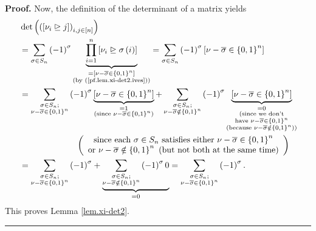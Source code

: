 \documentclass
[numbers=enddot,12pt,final,onecolumn,notitlepage,english]{scrartcl}%
\theoremstyle{definition}
\newenvironment{proof}[1][Proof]{\noindent\textbf{#1.} }{\ \rule{0.5em}{0.5em}}
\let\sumnonlimits\sum
\let\prodnonlimits\prod
\renewcommand{\sum}{\sumnonlimits\limits}
\renewcommand{\prod}{\prodnonlimits\limits}
\newenvironment{verlong}{}{}
\begin{document}
\begin{verlong}
\begin{proof}
Now, the definition of the determinant of a matrix yields%
\begin{align*}
&  \det\left(  \left(  \left[  \nu_{i}\trianglerighteq j\right]  \right)
_{i,j\in\left[  n\right]  }\right) \\
&  =\sum_{\sigma\in S_{n}}\left(  -1\right)  ^{\sigma}\underbrace{\prod
_{i=1}^{n}\left[  \nu_{i}\trianglerighteq\sigma\left(  i\right)  \right]
}_{\substack{=\left[  \nu-\overline{\sigma}\in\left\{  0,1\right\}
^{n}\right]  \\\text{(by (\ref{pf.lem.xi-det2.ives}))}}}=\sum_{\sigma\in
S_{n}}\left(  -1\right)  ^{\sigma}\left[  \nu-\overline{\sigma}\in\left\{
0,1\right\}  ^{n}\right] \\
&  =\sum_{\substack{\sigma\in S_{n};\\\nu-\overline{\sigma}\in\left\{
0,1\right\}  ^{n}}}\left(  -1\right)  ^{\sigma}\underbrace{\left[
\nu-\overline{\sigma}\in\left\{  0,1\right\}  ^{n}\right]  }%
_{\substack{=1\\\text{(since }\nu-\overline{\sigma}\in\left\{  0,1\right\}
^{n}\text{)}}}+\sum_{\substack{\sigma\in S_{n};\\\nu-\overline{\sigma}%
\notin\left\{  0,1\right\}  ^{n}}}\left(  -1\right)  ^{\sigma}%
\underbrace{\left[  \nu-\overline{\sigma}\in\left\{  0,1\right\}  ^{n}\right]
}_{\substack{=0\\\text{(since we don't}\\\text{have }\nu-\overline{\sigma}%
\in\left\{  0,1\right\}  ^{n}\\\text{(because }\nu-\overline{\sigma}%
\notin\left\{  0,1\right\}  ^{n}\text{))}}}\\
&  \ \ \ \ \ \ \ \ \ \ \ \ \ \ \ \ \ \ \ \ \left(
\begin{array}
[c]{c}%
\text{since each }\sigma\in S_{n}\text{ satisfies either }\nu-\overline
{\sigma}\in\left\{  0,1\right\}  ^{n}\\
\text{or }\nu-\overline{\sigma}\notin\left\{  0,1\right\}  ^{n}\text{ (but not
both at the same time)}%
\end{array}
\right) \\
&  =\sum_{\substack{\sigma\in S_{n};\\\nu-\overline{\sigma}\in\left\{
0,1\right\}  ^{n}}}\left(  -1\right)  ^{\sigma}+\underbrace{\sum
_{\substack{\sigma\in S_{n};\\\nu-\overline{\sigma}\notin\left\{  0,1\right\}
^{n}}}\left(  -1\right)  ^{\sigma}0}_{=0}=\sum_{\substack{\sigma\in
S_{n};\\\nu-\overline{\sigma}\in\left\{  0,1\right\}  ^{n}}}\left(  -1\right)
^{\sigma}.
\end{align*}
This proves Lemma \ref{lem.xi-det2}.
\end{proof}
\end{verlong}
\end{document}
